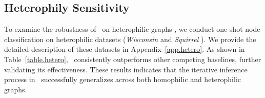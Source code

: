 \subsection{Heterophily Sensitivity}\label{sec.hetero}
To examine the robustness of \model\ on heterophilic graphs \cite{pei2020geom,yu2024non}, we conduct one-shot node classification on heterophilic datasets (\textit{Wisconsin} \cite{pei2020geom} and \textit{Squirrel} \cite{rozemberczki2021multi}). We provide the detailed description of these datasets in Appendix~\ref{app.hetero}.
As shown in Table~\ref{table.hetero}, \model\ consistently outperforms other competing baselines, further validating its effectiveness. These results indicates that the iterative inference process in \model\ successfully generalizes across both homophilic and heterophilic graphs. %


\begin{table}[tbp] %
    \centering
    \small
     \addtolength{\tabcolsep}{1mm}
    \caption{Accuracy (\%) evaluation on heterophilic datasets.
    }
    \label{table.hetero}%
\end{table}



